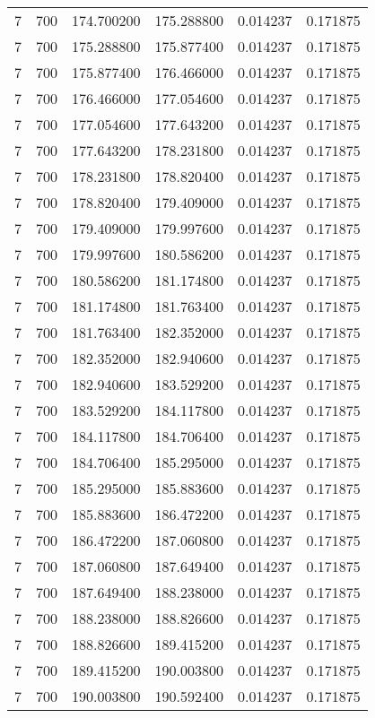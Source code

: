 \begin{longtable}{rrrrrr}
7 & 700 & 174.700200 & 175.288800 & 0.014237 & 0.171875 \\
7 & 700 & 175.288800 & 175.877400 & 0.014237 & 0.171875 \\
7 & 700 & 175.877400 & 176.466000 & 0.014237 & 0.171875 \\
7 & 700 & 176.466000 & 177.054600 & 0.014237 & 0.171875 \\
7 & 700 & 177.054600 & 177.643200 & 0.014237 & 0.171875 \\
7 & 700 & 177.643200 & 178.231800 & 0.014237 & 0.171875 \\
7 & 700 & 178.231800 & 178.820400 & 0.014237 & 0.171875 \\
7 & 700 & 178.820400 & 179.409000 & 0.014237 & 0.171875 \\
7 & 700 & 179.409000 & 179.997600 & 0.014237 & 0.171875 \\
7 & 700 & 179.997600 & 180.586200 & 0.014237 & 0.171875 \\
7 & 700 & 180.586200 & 181.174800 & 0.014237 & 0.171875 \\
7 & 700 & 181.174800 & 181.763400 & 0.014237 & 0.171875 \\
7 & 700 & 181.763400 & 182.352000 & 0.014237 & 0.171875 \\
7 & 700 & 182.352000 & 182.940600 & 0.014237 & 0.171875 \\
7 & 700 & 182.940600 & 183.529200 & 0.014237 & 0.171875 \\
7 & 700 & 183.529200 & 184.117800 & 0.014237 & 0.171875 \\
7 & 700 & 184.117800 & 184.706400 & 0.014237 & 0.171875 \\
7 & 700 & 184.706400 & 185.295000 & 0.014237 & 0.171875 \\
7 & 700 & 185.295000 & 185.883600 & 0.014237 & 0.171875 \\
7 & 700 & 185.883600 & 186.472200 & 0.014237 & 0.171875 \\
7 & 700 & 186.472200 & 187.060800 & 0.014237 & 0.171875 \\
7 & 700 & 187.060800 & 187.649400 & 0.014237 & 0.171875 \\
7 & 700 & 187.649400 & 188.238000 & 0.014237 & 0.171875 \\
7 & 700 & 188.238000 & 188.826600 & 0.014237 & 0.171875 \\
7 & 700 & 188.826600 & 189.415200 & 0.014237 & 0.171875 \\
7 & 700 & 189.415200 & 190.003800 & 0.014237 & 0.171875 \\
7 & 700 & 190.003800 & 190.592400 & 0.014237 & 0.171875 \\

\end{longtable}
